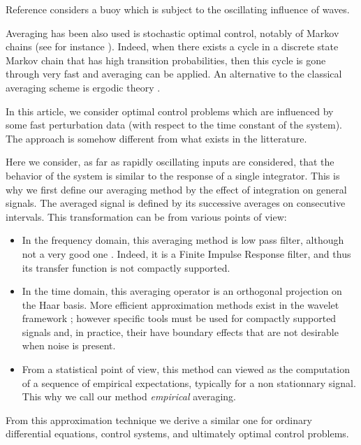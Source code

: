 \documentclass[a4paper,10pt]{article}
\begin{document}
Reference \cite{lepreux} considers a buoy which is subject to the 
oscillating influence of waves.


Averaging has been also used is stochastic optimal 
control, notably of Markov chains (see for instance 
\cite{hernandez-lasserre,VargasCDC2009,TsaiHaddaACC1994}). Indeed, 
when there exists a cycle in a discrete state Markov chain that has 
high transition probabilities, then this cycle is gone through very 
fast and averaging can be applied. An alternative to the classical 
averaging scheme is ergodic theory \cite{Buckdahn}.

In this article, we consider optimal control problems which are 
influenced by some fast perturbation data (with respect to the time 
constant of the system). The approach is somehow different from what 
exists in the litterature. 

Here we consider, as far as rapidly oscillating inputs are 
considered, that the behavior of the system is similar to the response of 
a single integrator. This is why we first define our  averaging 
method by the effect of integration on general signals. The averaged 
signal 
is defined by its successive averages on consecutive intervals. This 
transformation can be from various points of view:
\begin{itemize}
	\item  In the frequency domain, this averaging method is  low 
	pass filter, although not a very good one 
	\cite{LiTan2008,Stranneby2004,Oppenheim2010}. Indeed, it is a Finite 
	Impulse Response filter, and thus its transfer function is not 
	compactly supported.

	\item  In the time domain, this averaging operator is an 
	orthogonal projection on the Haar basis. More efficient 
	approximation methods exist in the wavelet framework \cite{Mallat98}; however 
	specific tools must be used for compactly supported signals 
	\cite{CohenDV:94,chaplais-denoising} and, in practice, their have 
	boundary effects that are not desirable when noise is present.

	\item  From a statistical point of view, this method can viewed 
	as the computation of a sequence of empirical expectations, 
	typically for a non stationnary signal. This why we call our 
	method {\em empirical} averaging.
\end{itemize}

From this approximation technique we derive a similar one for 
ordinary differential equations, control systems, and ultimately 
optimal control problems.
\end{document}
